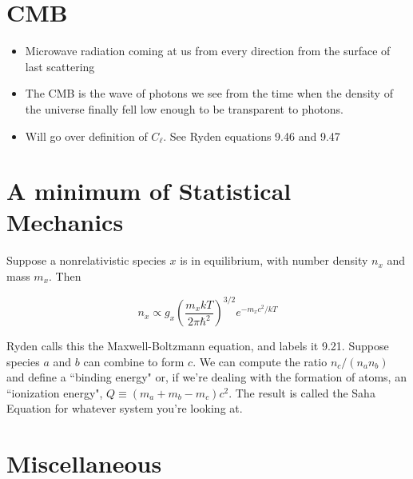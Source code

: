 \documentclass[12pt]{article}
\begin{document}
\section{CMB}

\begin{itemize}
\item Microwave radiation coming at us from every direction from the surface of last scattering
\item The CMB is the wave of photons we see from the time when the density of the universe finally fell low enough to be transparent to photons.
\item Will go over definition of \(C_{\ell}\). See Ryden equations 9.46 and 9.47
\end{itemize}


\section{A minimum of Statistical Mechanics}

Suppose a nonrelativistic species \(x\) is in equilibrium, with number density \(n_x\) and mass \(m_x\). Then

\[ n_x \propto g_x \left(\frac{m_x kT}{2\pi \hbar^2}\right)^{3/2}e^{-m_x c^2/kT}
\]

Ryden calls this the Maxwell-Boltzmann equation, and labels it 9.21. Suppose species \(a\) and \(b\) can combine to form \(c\). We can compute the ratio \(n_c/(n_a n_b)\) and define a ``binding energy" or, if we're dealing with the formation of atoms, an ``ionization energy", \(Q \equiv (m_a + m_b - m_c)c^2\). The result is called the Saha Equation for whatever system you're looking at.




\section{Miscellaneous}
\end{document}

